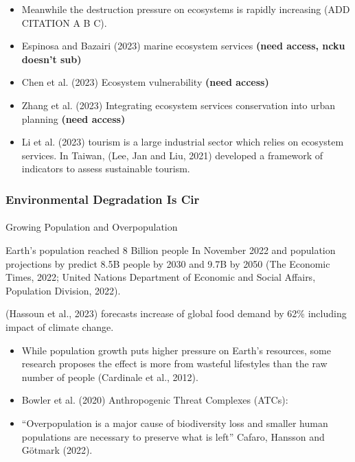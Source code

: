 \documentclass[
  letterpaper,
  DIV=11,
  numbers=noendperiod]{scrartcl}
\makeatletter
\let\oldparagraph\paragraph
\renewcommand{\paragraph}{
    \@ifstar
      \xxxParagraphStar
      \xxxParagraphNoStar
  }
\newcommand{\xxxParagraphStar}[1]{\oldparagraph*{#1}\mbox{}}
\newcommand{\xxxParagraphNoStar}[1]{\oldparagraph{#1}\mbox{}}
\makeatother
\begin{document}
\begin{itemize}
\item
  Meanwhile the destruction pressure on ecosystems is rapidly increasing
  (ADD CITATION A B C).
\item
  Espinosa and Bazairi (2023) marine ecosystem services \textbf{(need
  access, ncku doesn't sub)}
\item
  Chen et al. (2023) Ecosystem vulnerability \textbf{(need access)}
\item
  Zhang et al. (2023) Integrating ecosystem services conservation into
  urban planning \textbf{(need access)}
\item
  Li et al. (2023) tourism is a large industrial sector which relies on
  ecosystem services. In Taiwan, (Lee, Jan and Liu, 2021) developed a
  framework of indicators to assess sustainable tourism.
\end{itemize}

\subsubsection{\texorpdfstring{\textbf{Environmental Degradation Is
Cir}}{Environmental Degradation Is Cir}}\label{environmental-degradation-is-cir}

\paragraph{Growing Population and
Overpopulation}\label{growing-population-and-overpopulation}

Earth's population reached 8 Billion people In November 2022 and
population projections by predict 8.5B people by 2030 and 9.7B by 2050
(The Economic Times, 2022; United Nations Department of Economic and
Social Affairs, Population Division, 2022).

(Hassoun et al., 2023) forecasts increase of global food demand by 62\%
including impact of climate change.

\begin{itemize}
\item
  While population growth puts higher pressure on Earth's resources,
  some research proposes the effect is more from wasteful lifestyles
  than the raw number of people (Cardinale et al., 2012).
\item
  Bowler et al. (2020) Anthropogenic Threat Complexes (ATCs):
\item
  ``Overpopulation is a major cause of biodiversity loss and smaller
  human populations are necessary to preserve what is left'' Cafaro,
  Hansson and Götmark (2022).
\end{itemize}
\end{document}
